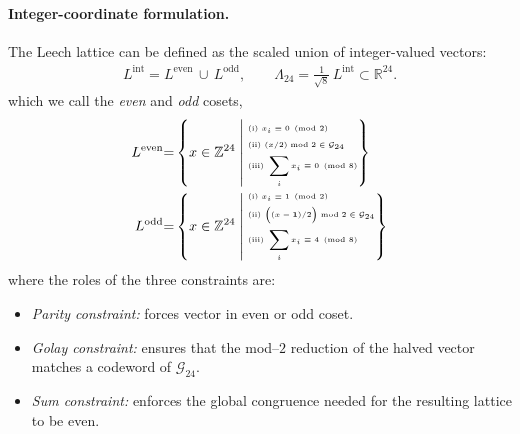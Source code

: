 \documentclass{article}
\theoremstyle{plain}
\theoremstyle{definition}
\theoremstyle{remark}
\begin{document}
\paragraph{Integer-coordinate formulation.}
The Leech lattice can be defined as the scaled union of integer-valued vectors:
{\setlength{\abovedisplayskip}{0pt}
\setlength{\belowdisplayskip}{0pt}
\setlength{\abovedisplayshortskip}{0pt}
\setlength{\belowdisplayshortskip}{1pt} %
\setlength{\jot}{3pt} %
\begin{align}
L^{\mathrm{int}} = L^{\mathrm{even}} \,\cup\, L^{\mathrm{odd}},
\qquad
\Lambda_{24} = \frac{1}{\sqrt{8}}\, L^{\mathrm{int}} \subset \mathbb{R}^{24}.
\end{align}
}
which we call the \textit{even} and \textit{odd} cosets,
\begin{align}
L^{\mathrm{even}}
&{=}\left\{
x \in \mathbb{Z}^{24}
\;\middle|\;
{\tiny
\begin{aligned}
&\text{(i) } x_i \equiv 0 \pmod{2} \\
&\text{(ii) } (x/2) \bmod 2 \in \mathcal{G}_{24} \\
&\text{(iii) } \sum_i x_i \equiv 0 \pmod{8}
\end{aligned}
}
\right\} \\
L^{\mathrm{odd}}
&{=}\left\{
x \in \mathbb{Z}^{24}
\;\middle|\;
{\tiny
\begin{aligned}
&\text{(i) } x_i \equiv 1 \pmod{2} \\
&\text{(ii) } \bigl((x-\mathbf{1})/2\bigr) \bmod 2 \in \mathcal{G}_{24} \\
&\text{(iii) } \sum_i x_i \equiv 4 \pmod{8}
\end{aligned}
}
\right\}
\end{align}
where the roles of the three constraints are:
\begin{itemize}
\vspace{-0.8em}
    \item[(i)] \emph{Parity constraint:} forces vector in even or odd coset.
\vspace{-0.5em}
    \item[(ii)] \emph{Golay constraint:} ensures that the mod--$2$ reduction of
    the halved vector matches a codeword of $\mathcal{G}_{24}$.
\vspace{-0.5em}
    \item[(iii)] \emph{Sum constraint:} enforces the global congruence needed for the resulting lattice to be even.
\vspace{-0.8em}
\end{itemize}
\end{document}
